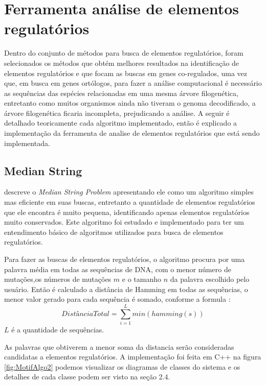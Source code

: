 \chapter{Ferramenta análise de elementos regulatórios} \label{cap2}

Dentro do conjunto de métodos para busca de elementos regulatórios, foram selecionados os métodos que obtém melhores resultados na identificação de elementos regulatórios e que focam as buscas em genes co-regulados, uma vez que, em busca em genes ortólogos, para fazer a análise computacional é necessário as sequências das espécies relacionadas em uma mesma árvore filogenética, entretanto como muitos organismos ainda não tiveram o genoma decodificado, a árvore filogenética ficaria incompleta, prejudicando a análise. A seguir é detalhado teoricamente cada algoritmo implementado, então é explicado a implementação da ferramenta de analise de elementos regulatórios que está sendo implementada.
 
\section{Median String}

\cite{Jones2004book} descreve o \textit{Median String Problem} apresentando ele como um algoritmo simples mas eficiente em suas buscas, entretanto a quantidade de elementos regulatórios que ele encontra é muito pequena, identificando apenas elementos regulatórios muito conservados. Este algoritmo foi estudado e implementado para ter um entendimento básico de  algoritmos utilizados para busca de elementos regulatórios.

Para fazer as buscas de elementos regulatórios, o algoritmo procura por uma palavra média em todas as sequências de DNA, com o menor número de mutações,os números de mutações $m$ e o tamanho $n$ da palavra escolhido pelo usuário. Então é calculado a distância de Hamming em todas as sequências, o menor valor gerado para cada sequência é somado, conforme a formula :
\begin{equation}
DistânciaTotal = \sum_{i = 1}^{L} min(hamming(s))
\end{equation}
$L$ é a quantidade de sequências.

As palavras que obtiverem a menor soma da distancia serão consideradas candidatas a elementos regulatórios. A implementação foi feita em C++ na figura \ref{fig:MotifAlgo2} podemos visualizar os diagramas de classes do sistema e os detalhes de cada classe podem ser visto na seção 2.4.

